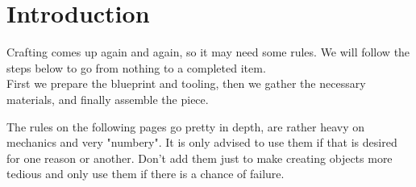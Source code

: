 \documentclass[12pt,a4paper,openany,usenames,dvipsnames]{book}
\begin{document}
	

	\chapter{Introduction}
	Crafting comes up again and again, so it may need some rules. We will follow the steps below to go from nothing to a completed item.\\
	First we prepare the blueprint and tooling, then we gather the necessary materials, and finally assemble the piece.
	\par
	\begin{exampleblock}
		The rules on the following pages go pretty in depth,
		are rather heavy on mechanics and very "numbery". 
		It is only advised to use them if that is desired for one reason or another.
		Don't add them just to make creating objects more tedious
			and only use them if there is a chance of failure.
	\end{exampleblock}
\end{document}
